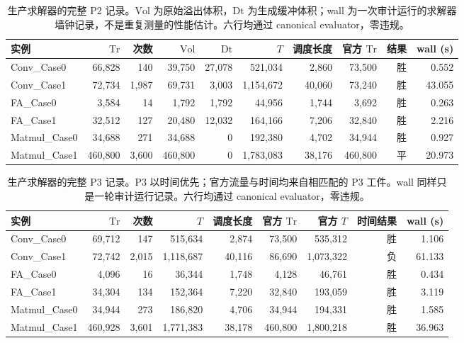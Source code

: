 \begin{table}[htbp]\centering
\caption{生产求解器的完整 P2 记录。$\mathrm{Vol}$ 为原始溢出体积，$\mathrm{Dt}$ 为生成缓冲体积；wall 为一次审计运行的求解器墙钟记录，不是重复测量的性能估计。六行均通过 canonical evaluator，零违规。}
\label{tab:supp-public-zh}
\setlength{\tabcolsep}{2.2pt}
\begin{tabular}{@{}lrrrrrrrrr@{}}\toprule
实例 & $\mathrm{Tr}$ & 次数 & $\mathrm{Vol}$ & $\mathrm{Dt}$ & $T$ & 调度长度 & 官方 $\mathrm{Tr}$ & 结果 & wall (s)\\\midrule
Conv\_Case0 & 66,828 & 140 & 39,750 & 27,078 & 521,034 & 2,860 & 73,500 & 胜 & 0.552\\
Conv\_Case1 & 72,734 & 1,987 & 69,731 & 3,003 & 1,154,672 & 40,060 & 73,240 & 胜 & 43.055\\
FA\_Case0 & 3,584 & 14 & 1,792 & 1,792 & 44,956 & 1,744 & 3,692 & 胜 & 0.263\\
FA\_Case1 & 32,512 & 127 & 20,480 & 12,032 & 164,166 & 7,206 & 32,840 & 胜 & 2.216\\
Matmul\_Case0 & 34,688 & 271 & 34,688 & 0 & 192,380 & 4,702 & 34,944 & 胜 & 0.927\\
Matmul\_Case1 & 460,800 & 3,600 & 460,800 & 0 & 1,783,083 & 38,176 & 460,800 & 平 & 20.973\\\bottomrule
\end{tabular}
\end{table}

\begin{table}[htbp]\centering
\caption{生产求解器的完整 P3 记录。P3 以时间优先；官方流量与时间均来自相匹配的 P3 工件。wall 同样只是一轮审计运行记录。六行均通过 canonical evaluator，零违规。}
\label{tab:supp-public-p3-zh}
\setlength{\tabcolsep}{2.4pt}
\begin{tabular}{@{}lrrrrrrrr@{}}\toprule
实例 & $\mathrm{Tr}$ & 次数 & $T$ & 调度长度 & 官方 $\mathrm{Tr}$ & 官方 $T$ & 时间结果 & wall (s)\\\midrule
Conv\_Case0 & 69,712 & 147 & 515,634 & 2,874 & 73,500 & 535,312 & 胜 & 1.106\\
Conv\_Case1 & 72,742 & 2,015 & 1,118,687 & 40,116 & 86,690 & 1,073,322 & 负 & 61.133\\
FA\_Case0 & 4,096 & 16 & 36,344 & 1,748 & 4,128 & 46,761 & 胜 & 0.434\\
FA\_Case1 & 34,304 & 134 & 152,364 & 7,220 & 32,840 & 193,059 & 胜 & 3.119\\
Matmul\_Case0 & 34,944 & 273 & 186,820 & 4,706 & 34,944 & 194,331 & 胜 & 1.585\\
Matmul\_Case1 & 460,928 & 3,601 & 1,771,383 & 38,178 & 460,800 & 1,800,218 & 胜 & 36.963\\\bottomrule
\end{tabular}
\end{table}

